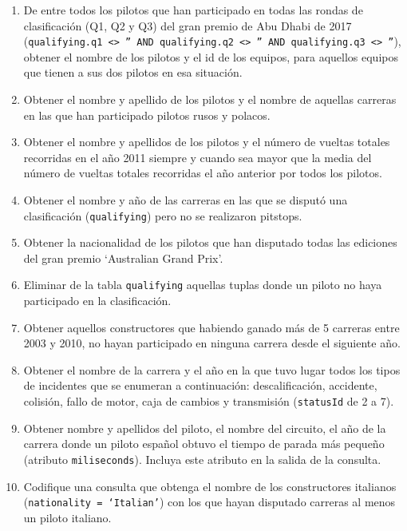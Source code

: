 \documentclass[a4paper]{article}
\begin{document}
\begin{enumerate}
    \item De entre todos los pilotos que han participado en todas las rondas de clasificación (Q1, Q2 y Q3) del gran premio de Abu Dhabi de 2017 (\texttt{qualifying.q1 <> '' AND qualifying.q2 <> '' AND qualifying.q3 <> ''}), obtener el nombre de los pilotos y el id de los equipos, para aquellos equipos que tienen a sus dos pilotos en esa situación.
    
    \item Obtener el nombre y apellido de los pilotos y el nombre de aquellas carreras en las que han participado pilotos rusos y polacos.
            
    \item Obtener el nombre y apellidos de los pilotos y el número de vueltas totales recorridas en el año 2011 siempre y cuando sea mayor que la media del número de vueltas totales recorridas el año anterior por todos los pilotos.

    \item Obtener el nombre y año de las carreras en las que se disputó una clasificación (\texttt{qualifying}) pero no se realizaron pitstops.
    
    \item Obtener la nacionalidad de los pilotos que han disputado todas las ediciones del gran premio `Australian Grand Prix'.
    
    \item Eliminar de la tabla \texttt{qualifying} aquellas tuplas donde un piloto no haya participado en la clasificación.
            
    \item Obtener aquellos constructores que habiendo ganado más de 5 carreras entre 2003 y 2010, no hayan participado en ninguna carrera desde el siguiente año.
    
    \item Obtener el nombre de la carrera y el año en la que tuvo lugar todos los tipos de incidentes que se enumeran a continuación: descalificación, accidente, colisión, fallo de motor, caja de cambios y transmisión (\texttt{statusId} de 2 a 7).
    
    \item Obtener nombre y apellidos del piloto, el nombre del circuito, el año de la carrera donde un piloto español obtuvo el tiempo de parada más pequeño (atributo \texttt{miliseconds}). Incluya este atributo en la salida de la consulta.

    \item Codifique una consulta que obtenga el nombre de los constructores italianos (\texttt{nationality = `Italian'}) con los que hayan disputado carreras al menos un piloto italiano.
            

\end{enumerate}
\end{document}
